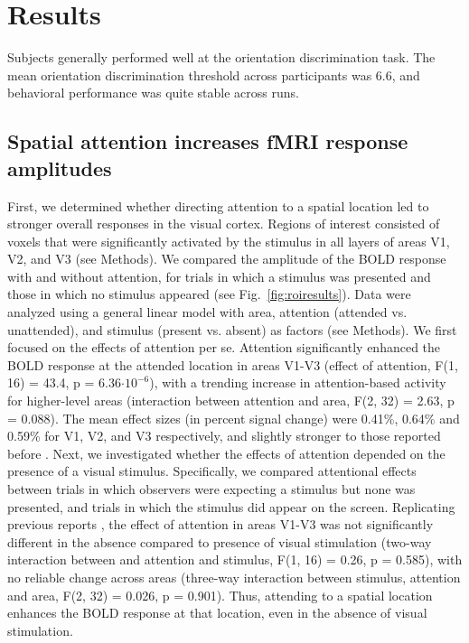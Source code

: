\section{Results}
Subjects generally performed well at the orientation discrimination task. The mean orientation discrimination threshold across participants was 6.6\textdegree, and behavioral performance was quite stable across runs.

\subsection{Spatial attention increases fMRI response amplitudes}
First, we determined whether directing attention to a spatial location led to stronger overall responses in the visual cortex. Regions of interest consisted of voxels that were significantly activated by the stimulus in all layers of areas V1, V2, and V3 (see Methods). We compared the amplitude of the BOLD response with and without attention, for trials in which a stimulus was presented and those in which no stimulus appeared (see Fig.~\ref{fig:roiresults}). Data were analyzed using a general linear model with area, attention (attended vs. unattended), and stimulus (present vs. absent) as factors (see Methods). We first focused on the effects of attention per se. Attention significantly enhanced the BOLD response at the attended location in areas V1-V3 (effect of attention, F(1, 16) = 43.4, p = 6.36$\cdot10^{-6}$), with a trending increase in attention-based activity for higher-level areas (interaction between attention and area, F(2, 32) = 2.63, p = 0.088). The mean effect sizes (in percent signal change) were 0.41\%, 0.64\% and 0.59\% for V1, V2, and V3 respectively, and slightly stronger to those reported before \cite{Murray2008,Jehee2011}. Next, we investigated whether the effects of attention depended on the presence of a visual stimulus. Specifically, we compared attentional effects between trials in which observers were expecting a stimulus but none was presented, and trials in which the stimulus did appear on the screen. Replicating previous reports \cite{Kastner1999}, the effect of attention in areas V1-V3 was not significantly different in the absence compared to presence of visual stimulation (two-way interaction between and attention and stimulus, F(1, 16) = 0.26, p = 0.585), with no reliable change across areas (three-way interaction between stimulus, attention and area, F(2, 32) = 0.026, p = 0.901). Thus, attending to a spatial location enhances the BOLD response at that location, even in the absence of visual stimulation.


